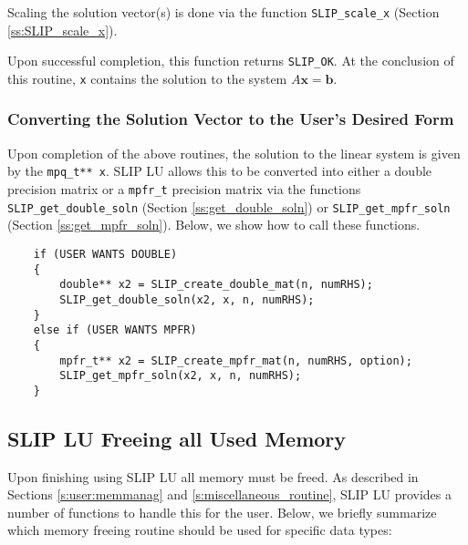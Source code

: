 \documentclass[12pt]{article}
\theoremstyle{definition}
\begin{document}
Scaling the solution vector(s) is done via the function \verb|SLIP_scale_x|
(Section \ref{ss:SLIP_scale_x}).

Upon successful completion, this function returns \verb|SLIP_OK|. At the
conclusion of this routine, \verb|x| contains the solution to the system $A
\mathbf{x} = \mathbf{b}$.

\subsubsection{Converting the Solution Vector to the User's Desired Form}

Upon completion of the above routines, the solution to the linear system is
given by the \verb|mpq_t** x|. SLIP LU allows this to be converted into either
a double precision matrix or a \verb|mpfr_t| precision matrix via the functions
\verb|SLIP_get_double_soln| (Section \ref{ss:get_double_soln}) or
\verb|SLIP_get_mpfr_soln| (Section \ref{ss:get_mpfr_soln}). Below, we show how
to call these functions.

{\small
\begin{verbatim}
    if (USER WANTS DOUBLE)
    {
        double** x2 = SLIP_create_double_mat(n, numRHS);
        SLIP_get_double_soln(x2, x, n, numRHS);
    }
    else if (USER WANTS MPFR)
    {
        mpfr_t** x2 = SLIP_create_mpfr_mat(n, numRHS, option);
        SLIP_get_mpfr_soln(x2, x, n, numRHS);
    } \end{verbatim}}

\cprotect\subsection{SLIP LU Freeing all Used Memory}
\label{s:Using:free}

Upon finishing using SLIP LU all memory must be freed. As described in Sections
\ref{s:user:memmanag} and \ref{s:miscellaneous_routine}, SLIP LU provides a
number of functions to handle this for the user. Below, we briefly summarize
which memory freeing routine should be used for specific data types:
\end{document}
